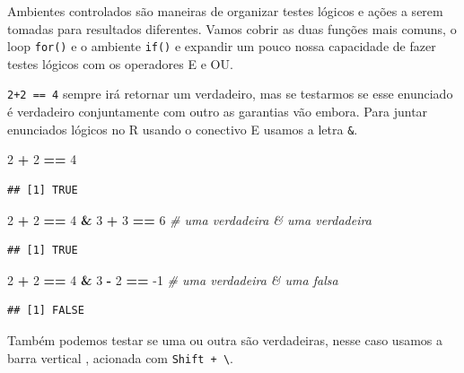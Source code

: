 \documentclass[
]{article}
\newenvironment{Shaded}{\begin{snugshade}}{\end{snugshade}}
\newcommand{\CommentTok}[1]{\textcolor[rgb]{0.56,0.35,0.01}{\textit{#1}}}
\newcommand{\DecValTok}[1]{\textcolor[rgb]{0.00,0.00,0.81}{#1}}
\newcommand{\OperatorTok}[1]{\textcolor[rgb]{0.81,0.36,0.00}{\textbf{#1}}}
\newcommand{\StringTok}[1]{\textcolor[rgb]{0.31,0.60,0.02}{#1}}
\begin{document}
Ambientes controlados são maneiras de organizar testes lógicos e ações a
serem tomadas para resultados diferentes. Vamos cobrir as duas funções
mais comuns, o loop \texttt{for()} e o ambiente \texttt{if()} e expandir
um pouco nossa capacidade de fazer testes lógicos com os operadores E e
OU.

\texttt{2+2\ ==\ 4} sempre irá retornar um verdadeiro, mas se testarmos
se esse enunciado é verdadeiro conjuntamente com outro as garantias vão
embora. Para juntar enunciados lógicos no R usando o conectivo E usamos
a letra \texttt{\&}.

\begin{Shaded}
\begin{Highlighting}[]
\DecValTok{2} \OperatorTok{+}\StringTok{ }\DecValTok{2} \OperatorTok{==}\StringTok{ }\DecValTok{4}
\end{Highlighting}
\end{Shaded}

\begin{verbatim}
## [1] TRUE
\end{verbatim}

\begin{Shaded}
\begin{Highlighting}[]
\DecValTok{2} \OperatorTok{+}\StringTok{ }\DecValTok{2} \OperatorTok{==}\StringTok{ }\DecValTok{4} \OperatorTok{&}\StringTok{ }\DecValTok{3} \OperatorTok{+}\StringTok{ }\DecValTok{3} \OperatorTok{==}\StringTok{ }\DecValTok{6} \CommentTok{# uma verdadeira & uma verdadeira}
\end{Highlighting}
\end{Shaded}

\begin{verbatim}
## [1] TRUE
\end{verbatim}

\begin{Shaded}
\begin{Highlighting}[]
\DecValTok{2} \OperatorTok{+}\StringTok{ }\DecValTok{2} \OperatorTok{==}\StringTok{ }\DecValTok{4} \OperatorTok{&}\StringTok{ }\DecValTok{3} \OperatorTok{-}\StringTok{ }\DecValTok{2} \OperatorTok{==}\StringTok{ }\DecValTok{-1} \CommentTok{# uma verdadeira & uma falsa}
\end{Highlighting}
\end{Shaded}

\begin{verbatim}
## [1] FALSE
\end{verbatim}

Também podemos testar se uma ou outra são verdadeiras, nesse caso usamos
a barra vertical \texttt{\textbar{}}, acionada com
\texttt{Shift\ +\ \textbackslash{}}.
\end{document}
